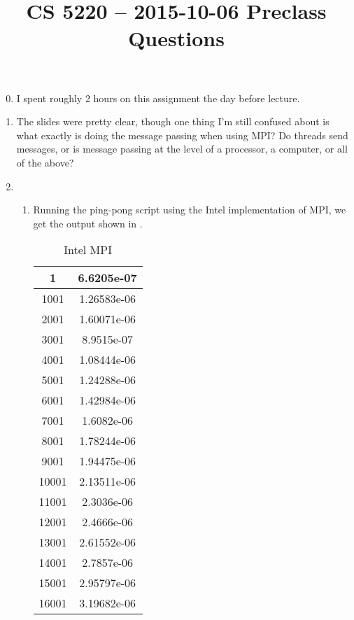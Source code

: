 \documentclass{hw}
\title{CS 5220 -- 2015-10-06 Preclass Questions}
\begin{document}
\maketitle{}

\begin{enumerate}
  \setcounter{enumi}{-1}
  \item
    I spent roughly 2 hours on this assignment the day before lecture.

  \item
    The slides were pretty clear, though one thing I'm still confused about is
    what exactly is doing the message passing when using MPI? Do threads send
    messages, or is message passing at the level of a processor, a computer, or
    all of the above?

  \item
    \begin{enumerate}
      \item
        Running the ping-pong script using the Intel implementation of MPI, we
        get the output shown in .

        \begin{table}[h]
          \centering
          \begin{tabular}{|c|c|}
            \hline 1     & 6.6205e-07  \\\hline
            1001  & 1.26583e-06 \\\hline
            2001  & 1.60071e-06 \\\hline
            3001  & 8.9515e-07 \\\hline
            4001  & 1.08444e-06 \\\hline
            5001  & 1.24288e-06 \\\hline
            6001  & 1.42984e-06 \\\hline
            7001  & 1.6082e-06 \\\hline
            8001  & 1.78244e-06 \\\hline
            9001  & 1.94475e-06 \\\hline
            10001 & 2.13511e-06 \\\hline
            11001 & 2.3036e-06 \\\hline
            12001 & 2.4666e-06 \\\hline
            13001 & 2.61552e-06 \\\hline
            14001 & 2.7857e-06 \\\hline
            15001 & 2.95797e-06 \\\hline
            16001 & 3.19682e-06 \\\hline
          \end{tabular}
          \caption{Intel MPI}
          \label{tab:intel}
        \end{table}


\end{enumerate}
\end{enumerate}
\end{document}
